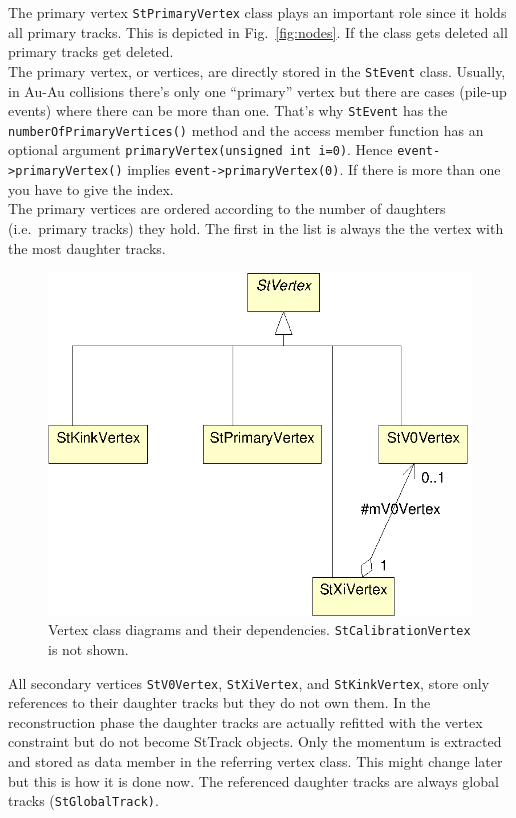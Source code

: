 \documentclass[twoside]{article}
\begin{document}
The primary vertex \texttt{StPrimaryVertex} class plays an important
role since it holds all primary tracks. This is depicted in
Fig.~\ref{fig:nodes}. If the
class gets deleted all primary tracks get deleted. \\
The primary vertex, or vertices, are directly stored in the
\texttt{StEvent} class. Usually, in Au-Au collisions there's only one
``primary'' vertex but there are cases (pile-up events) where there
can be more than one.  That's why \texttt{StEvent} has the
\texttt{numberOfPrimaryVertices()} method and the access member
function has an optional argument \texttt{primaryVertex(unsigned int
    i=0)}.  Hence \texttt{event->primaryVertex()} implies
\texttt{event->primaryVertex(0)}. If there is more than one you have
to give the index.\\
The primary vertices are ordered according to the number of daughters
(i.e.~primary tracks) they hold. The first in the list is always the
the vertex with the most daughter tracks. 
\begin{figure}[htb]
    \begin{center}
        \includegraphics{vertex.eps}
        \caption{Vertex class diagrams and their dependencies.
            \texttt{StCalibrationVertex} is not shown.}
        \label{fig:vertex}
    \end{center}
\end{figure}

All secondary vertices \texttt{StV0Vertex}, \texttt{StXiVertex}, and
\texttt{StKinkVertex}, store only references to their daughter tracks
but they do not own them. In the reconstruction phase the daughter
tracks are actually refitted with the vertex constraint but do not
become StTrack objects. Only the momentum is extracted and stored as
data member in the referring vertex class. This might change later but
this is how it is done now. The referenced daughter tracks are always
global tracks (\texttt{StGlobalTrack)}.
\end{document}
